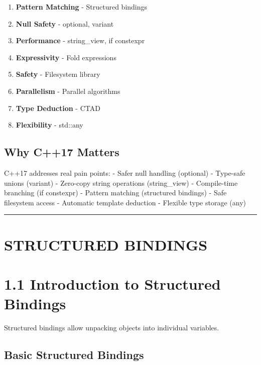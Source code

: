 \begin{enumerate}
\def\labelenumi{\arabic{enumi}.}
\tightlist
\item
  \textbf{Pattern Matching} - Structured bindings
\item
  \textbf{Null Safety} - optional, variant
\item
  \textbf{Performance} - string\_view, if constexpr
\item
  \textbf{Expressivity} - Fold expressions
\item
  \textbf{Safety} - Filesystem library
\item
  \textbf{Parallelism} - Parallel algorithms
\item
  \textbf{Type Deduction} - CTAD
\item
  \textbf{Flexibility} - std::any
\end{enumerate}

\hypertarget{why-c17-matters}{%
\subsection{Why C++17 Matters}\label{why-c17-matters}}

C++17 addresses real pain points: - Safer null handling (optional) -
Type-safe unions (variant) - Zero-copy string operations (string\_view)
- Compile-time branching (if constexpr) - Pattern matching (structured
bindings) - Safe filesystem access - Automatic template deduction -
Flexible type storage (any)

\begin{center}\rule{0.5\linewidth}{0.5pt}\end{center}

\hypertarget{structured-bindings}{%
\section{STRUCTURED BINDINGS}\label{structured-bindings}}

\hypertarget{introduction-to-structured-bindings}{%
\section{1.1 Introduction to Structured
Bindings}\label{introduction-to-structured-bindings}}

Structured bindings allow unpacking objects into individual variables.

\hypertarget{basic-structured-bindings}{%
\subsection{Basic Structured Bindings}\label{basic-structured-bindings}}

